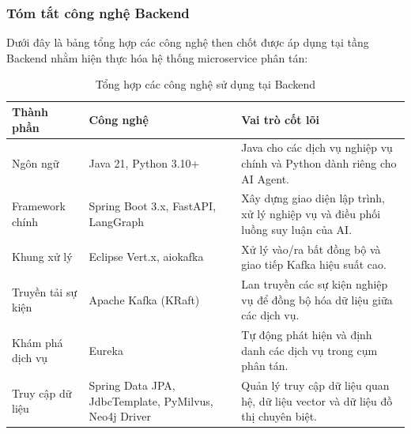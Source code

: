 \subsubsection{Tóm tắt công nghệ Backend}

Dưới đây là bảng tổng hợp các công nghệ then chốt được áp dụng tại tầng Backend nhằm hiện thực hóa hệ thống microservice phân tán:

\begin{table}[H]
\centering
\caption{Tổng hợp các công nghệ sử dụng tại Backend}
\label{tab:backend_tech}
\begin{tabular}{|l|p{4.5cm}|p{6cm}|}
\hline
\textbf{Thành phần} & \textbf{Công nghệ} & \textbf{Vai trò cốt lõi} \\ \hline
Ngôn ngữ & Java 21, Python 3.10+ & Java cho các dịch vụ nghiệp vụ chính và Python dành riêng cho AI Agent. \\ \hline
Framework chính & Spring Boot 3.x, FastAPI, LangGraph & Xây dựng giao diện lập trình, xử lý nghiệp vụ và điều phối luồng suy luận của AI. \\ \hline
Khung xử lý & Eclipse Vert.x, aiokafka & Xử lý vào/ra bất đồng bộ và giao tiếp Kafka hiệu suất cao. \\ \hline
Truyền tải sự kiện & Apache Kafka (KRaft) & Lan truyền các sự kiện nghiệp vụ để đồng bộ hóa dữ liệu giữa các dịch vụ. \\ \hline
Khám phá dịch vụ & Eureka & Tự động phát hiện và định danh các dịch vụ trong cụm phân tán. \\ \hline
Truy cập dữ liệu & Spring Data JPA, JdbcTemplate, PyMilvus, Neo4j Driver & Quản lý truy cập dữ liệu quan hệ, dữ liệu vector và dữ liệu đồ thị chuyên biệt. \\ \hline
\end{tabular}
\end{table}




